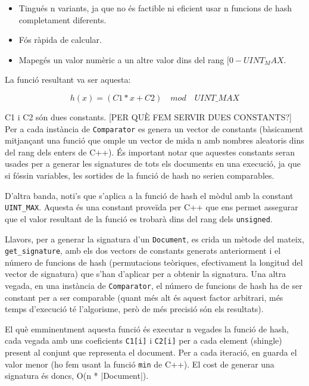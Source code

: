 \documentclass[catalan, 12pt]{report}
\begin{document}
\begin{itemize}
\item Tingués n variants, ja que no és factible ni eficient usar n funcions de hash completament diferents.
\item Fós ràpida de calcular.
\item Mapegés un valor numèric a un altre valor dins del rang \([0 - UINT_MAX\).
\end{itemize}

La funció resultant va ser aquesta:

\[h(x) = (C1 * x + C2) \quad mod \quad UINT\_MAX \]

C1 i C2 són dues constants. [PER QUÈ FEM SERVIR DUES CONSTANTS?] Per a cada instància de \verb|Comparator| es genera un vector de constants (bàsicament mitjançant una funció que omple un vector de mida n amb nombres aleatoris dins del rang dels enters de C++). És important notar que aquestes constants seran usades per a generar les signatures de tots els documents en una execució, ja que si fóssin variables, les sortides de la funció de hash no serien comparables.\newline

D'altra banda, noti's que s'aplica a la funció de hash el mòdul amb la constant \verb|UINT_MAX|. Aquesta és una constant proveïda per C++ que ens permet assegurar que el valor resultant de la funció es trobarà dins del rang dels \verb|unsigned|.\newline

Llavors, per a generar la signatura d'un \verb|Document|, es crida un mètode del mateix, \verb|get_signature|, amb els dos vectors de constants generats anteriorment i el número de funcions de hash (permutacions teòriques, efectivament la longitud del vector de signatura) que s'han d'aplicar per a obtenir la signatura. Una altra vegada, en una instància de \verb|Comparator|, el número de funcions de hash ha de ser constant per a ser comparable (quant més alt és aquest factor arbitrari, més temps d'execució té l'algorisme, però de més precisió són els resultats).\newline

El què emminentment aquesta funció és executar n vegades la funció de hash, cada vegada amb uns coeficients \verb|C1[i]| i \verb|C2[i]| per a cada element (shingle) present al conjunt que representa el document. Per a cada iteració, en guarda el valor menor (ho fem usant la funció \verb|min| de C++). El cost de generar una signatura és doncs, O(n * |Document|).\newline
\end{document}
